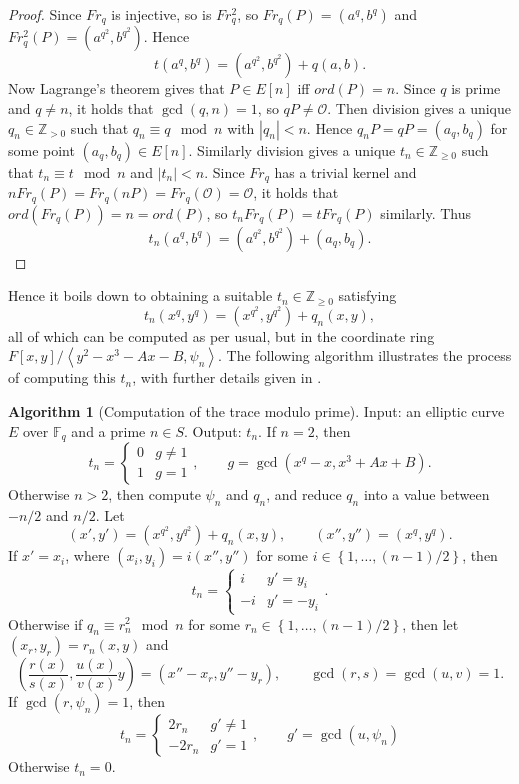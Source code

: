 \documentclass{article}
\newcommand{\F}{\mathbb{F}}
\newcommand{\Z}{\mathbb{Z}}
\newcommand{\rb}[1]{\left( #1 \right)}
\renewcommand{\sb}[1]{\left[ #1 \right]}
\newcommand{\cb}[1]{\left\{ #1 \right\}}
\newcommand{\ab}[1]{\left\langle #1 \right\rangle}
\newcommand{\abs}[1]{\left\lvert #1 \right\rvert}
\theoremstyle{definition}
\newtheorem{algorithm}[proposition]{Algorithm}
\begin{document}
\begin{proof}
Since $ Fr_q $ is injective, so is $ Fr_q^2 $, so $ Fr_q\rb{P} = \rb{a^q, b^q} $ and $ Fr_q^2\rb{P} = \rb{a^{q^2}, b^{q^2}} $. Hence
$$ t\rb{a^q, b^q} = \rb{a^{q^2}, b^{q^2}} + q\rb{a, b}. $$
Now Lagrange's theorem gives that $ P \in E\sb{n} $ iff $ ord\rb{P} = n $. Since $ q $ is prime and $ q \ne n $, it holds that $ \gcd\rb{q, n} = 1 $, so $ qP \ne \mathcal{O} $. Then division gives a unique $ q_n \in \Z_{> 0} $ such that $ q_n \equiv q \mod n $ with $ \abs{q_n} < n $. Hence $ q_nP = qP = \rb{a_q, b_q} $ for some point $ \rb{a_q, b_q} \in E\sb{n} $. Similarly division gives a unique $ t_n \in \Z_{\ge 0} $ such that $ t_n \equiv t \mod n $ and $ \abs{t_n} < n $. Since $ Fr_q $ has a trivial kernel and $ nFr_q\rb{P} = Fr_q\rb{nP} = Fr_q\rb{\mathcal{O}} = \mathcal{O} $, it holds that $ ord\rb{Fr_q\rb{P}} = n = ord\rb{P} $, so $ t_nFr_q\rb{P} = tFr_q\rb{P} $ similarly. Thus
$$ t_n\rb{a^q, b^q} = \rb{a^{q^2}, b^{q^2}} + \rb{a_q, b_q}. $$
\end{proof}

Hence it boils down to obtaining a suitable $ t_n \in \Z_{\ge 0} $ satisfying
$$ t_n\rb{x^q, y^q} = \rb{x^{q^2}, y^{q^2}} + q_n\rb{x, y}, $$
all of which can be computed as per usual, but in the coordinate ring $ F\sb{x, y} / \ab{y^2 - x^3 - Ax - B, \psi_n} $. The following algorithm illustrates the process of computing this $ t_n $, with further details given in \cite{crypto}.

\begin{algorithm}[Computation of the trace modulo prime]
Input: an elliptic curve $ E $ over $ \F_q $ and a prime $ n \in S $. Output: $ t_n $. If $ n = 2 $, then
$$ t_n = \begin{cases} 0 & g \ne 1 \\ 1 & g = 1 \end{cases}, \qquad g = \gcd\rb{x^q - x, x^3 + Ax + B}. $$
Otherwise $ n > 2 $, then compute $ \psi_n $ and $ q_n $, and reduce $ q_n $ into a value between $ -n / 2 $ and $ n / 2 $. Let
$$ \rb{x', y'} = \rb{x^{q^2}, y^{q^2}} + q_n\rb{x, y}, \qquad \rb{x'', y''} = \rb{x^q, y^q}. $$
If $ x' = x_i $, where $ \rb{x_i, y_i} = i\rb{x'', y''} $ for some $ i \in \cb{1, \dots, \rb{n - 1} / 2} $, then
$$ t_n = \begin{cases} i & y' = y_i \\ -i & y' = -y_i \end{cases}. $$
Otherwise if $ q_n \equiv r_n^2 \mod n $ for some $ r_n \in \cb{1, \dots, \rb{n - 1} / 2} $, then let $ \rb{x_r, y_r} = r_n\rb{x, y} $ and
$$ \rb{\dfrac{r\rb{x}}{s\rb{x}}, \dfrac{u\rb{x}}{v\rb{x}}y} = \rb{x'' - x_r, y'' - y_r}, \qquad \gcd\rb{r, s} = \gcd\rb{u, v} = 1. $$
If $ \gcd\rb{r, \psi_n} = 1 $, then
$$ t_n = \begin{cases} 2r_n & g' \ne 1 \\ -2r_n & g' = 1 \end{cases}, \qquad g' = \gcd\rb{u, \psi_n} $$
Otherwise $ t_n = 0 $.
\end{algorithm}
\end{document}
